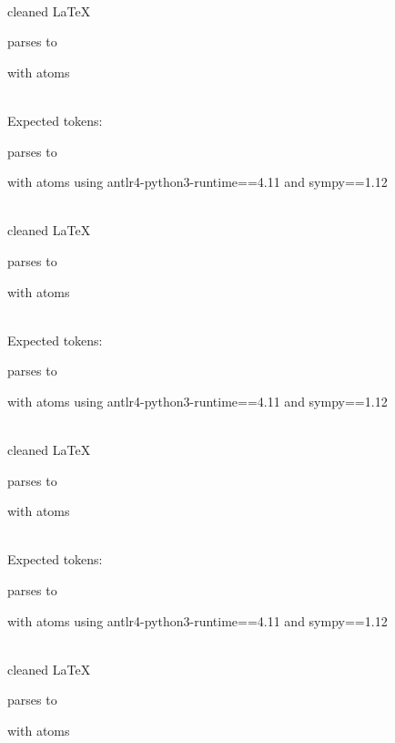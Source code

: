 \documentclass{article}
\begin{document}
\ \\
cleaned \LaTeX

parses to

with atoms


\ \\
Expected tokens:


\hrulefill


parses to

with atoms
using antlr4-python3-runtime==4.11 and sympy==1.12

\ \\
cleaned \LaTeX

parses to

with atoms


\ \\
Expected tokens:



\hrulefill


parses to

with atoms
using antlr4-python3-runtime==4.11 and sympy==1.12

\ \\
cleaned \LaTeX

parses to

with atoms


\ \\
Expected tokens:



\hrulefill


parses to

with atoms
using antlr4-python3-runtime==4.11 and sympy==1.12

\ \\
cleaned \LaTeX

parses to

with atoms

\end{document}
